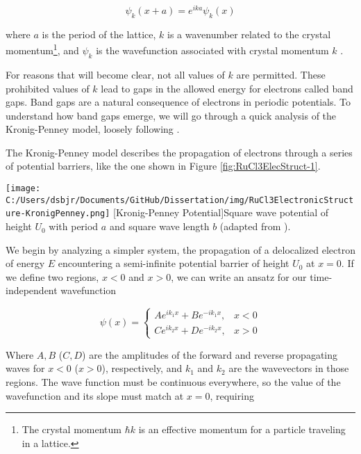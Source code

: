 \begin{equation}
\psi_{k}(x + a) = e^{ika} \psi_{k}(x)
\end{equation}

where $a$ is the period of the lattice, $k$ is a wavenumber related to the crystal momentum\footnote{The crystal momentum $\hbar k$ is an effective momentum for a particle traveling in a lattice.}, and $\psi_{k}$ is the wavefunction associated with crystal momentum $k$ \cite{Davies1997}.

For reasons that will become clear, not all values of $k$ are permitted. These prohibited values of $k$ lead to gaps in the allowed energy for electrons called band gaps. Band gaps are a natural consequence of electrons in periodic potentials. To understand how band gaps emerge, we will go through a quick analysis of the Kronig-Penney model, loosely following \cite{Davies1997}.

The Kronig-Penney model describes the propagation of electrons through a series of potential barriers, like the one shown in Figure \ref{fig:RuCl3ElecStruct-1}.

\begin{centering}
\texttt{[image: C:/Users/dsbjr/Documents/GitHub/Dissertation/img/RuCl3ElectronicStructure-KronigPenney.png]}
  \captionsetup{width=0.75\textwidth}
  [Kronig-Penney Potential]{Square wave potential of height $U_{0}$ with period $a$ and square wave length $b$ (adapted from \cite{Erez2014}).} 
  \label{fig:RuCl3ElecStruct-1}
\end{centering}

We begin by analyzing a simpler system, the propagation of a delocalized electron of energy $E$ encountering a semi-infinite potential barrier of height $U_{0}$ at $x = 0$. If we define two regions, $x <0$ and $x>0$, we can write an ansatz for our time-independent wavefunction

\begin{equation}
\psi(x) =
	\begin{cases}
	A e^{i k_{1} x} + B e^{-i k_{1} x}, & x < 0 \\
	C e^{i k_{2} x} + D e^{-i k_{2} x}, & x > 0
	\end{cases}
\end{equation}
	
Where $A,B$ ($C,D$) are the amplitudes of the forward and reverse propagating waves for $x<0$ ($x>0$), respectively, and $k_{1}$ and $k_{2}$ are the wavevectors in those regions. The wave function must be continuous everywhere, so the value of the wavefunction and its slope must match at $x = 0$, requiring

